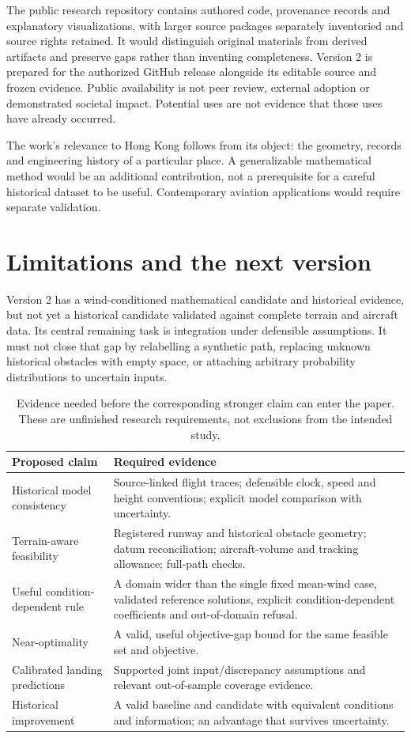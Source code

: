 The public research repository contains authored code, provenance records and explanatory visualizations, with larger source packages separately inventoried and source rights retained. It would distinguish original materials from derived artifacts and preserve gaps rather than inventing completeness. Version 2 is prepared for the authorized GitHub release alongside its editable source and frozen evidence. Public availability is not peer review, external adoption or demonstrated societal impact. Potential uses are not evidence that those uses have already occurred.

The work's relevance to Hong Kong follows from its object: the geometry, records and engineering history of a particular place. A generalizable mathematical method would be an additional contribution, not a prerequisite for a careful historical dataset to be useful. Contemporary aviation applications would require separate validation.

\section{Limitations and the next version}
\label{sec:next}
Version 2 has a wind-conditioned mathematical candidate and historical evidence, but not yet a historical candidate validated against complete terrain and aircraft data. Its central remaining task is integration under defensible assumptions. It must not close that gap by relabelling a synthetic path, replacing unknown historical obstacles with empty space, or attaching arbitrary probability distributions to uncertain inputs.

\begin{table}[H]
\caption{Evidence needed before the corresponding stronger claim can enter the paper. These are unfinished research requirements, not exclusions from the intended study.}
\small
\begin{tabularx}{\textwidth}{@{}p{}X@{}}
\toprule
Proposed claim & Required evidence\\
\midrule
Historical model consistency & Source-linked flight traces; defensible clock, speed and height conventions; explicit model comparison with uncertainty.\\
Terrain-aware feasibility & Registered runway and historical obstacle geometry; datum reconciliation; aircraft-volume and tracking allowance; full-path checks.\\
Useful condition-dependent rule & A domain wider than the single fixed mean-wind case, validated reference solutions, explicit condition-dependent coefficients and out-of-domain refusal.\\
Near-optimality & A valid, useful objective-gap bound for the same feasible set and objective.\\
Calibrated landing predictions & Supported joint input/discrepancy assumptions and relevant out-of-sample coverage evidence.\\
Historical improvement & A valid baseline and candidate with equivalent conditions and information; an advantage that survives uncertainty.\\
\bottomrule
\end{tabularx}
\end{table}

